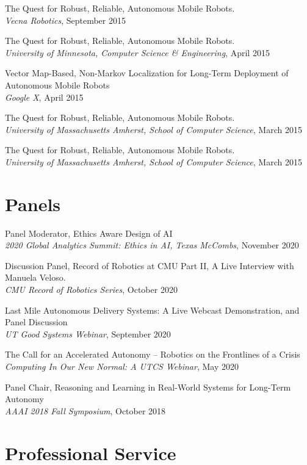 \documentclass[Times]{article}
\begin{document}
The Quest for Robust, Reliable, Autonomous Mobile Robots.\\
{\em Vecna Robotics}, September 2015

The Quest for Robust, Reliable, Autonomous Mobile Robots.\\
{\em University of Minnesota, Computer Science \& Engineering}, April 2015

Vector Map-Based, Non-Markov Localization for Long-Term Deployment of Autonomous Mobile Robots\\
{\em Google X}, April 2015

The Quest for Robust, Reliable, Autonomous Mobile Robots.\\
{\em University of Massachusetts Amherst, School of Computer Science}, March 2015

The Quest for Robust, Reliable, Autonomous Mobile Robots.\\
{\em University of Massachusetts Amherst, School of Computer Science}, March 2015


\section*{Panels}
Panel Moderator, Ethics Aware Design of AI\\
{\em 2020 Global Analytics Summit: Ethics in AI, Texas McCombs}, November 2020

Discussion Panel, Record of Robotics at CMU Part II, A Live Interview with
Manuela Veloso.\\
{\em CMU Record of Robotics Series}, October 2020

Last Mile Autonomous Delivery Systems: A Live Webcast Demonstration, and Panel Discussion\\
{\em UT Good Systems Webinar}, September 2020

The Call for an Accelerated Autonomy -- Robotics on the Frontlines of a Crisis\\
{\em Computing In Our New Normal: A UTCS Webinar}, May 2020

Panel Chair, Reasoning and Learning in Real-World Systems for Long-Term
Autonomy\\
{\em AAAI 2018 Fall Symposium}, October 2018

\section*{Professional Service}
\end{document}
